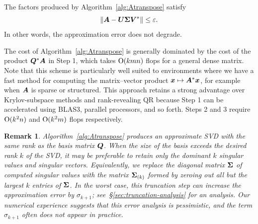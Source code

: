 \documentclass[final]{siamltex}
\newcounter{algorithm}[section]
\newtheorem{remark}{Remark}[section]
\begin{document}
The factors produced by Algorithm~\ref{alg:Atranspose}
satisfy
\begin{equation} \label{eq:noworse}
\norm{ \mtx{A} - \mtx{U\Sigma V}^\adj } \leq \eps.
\end{equation}
In other words, the approximation error does not degrade.

The cost of Algorithm~\ref{alg:Atranspose} is generally dominated
by the cost of the product $\bm{Q}^* \bm{A}$ in Step 1, which
takes $\mathrm{O}(kmn)$ flops for a general dense matrix.  Note that this
scheme is particularly well suited to environments where we have a
fast method for computing the matrix--vector product
$\bm{x} \mapsto \bm{A}^* \bm{x}$, for example when $\bm{A}$ is
sparse or structured.  This approach retains a strong advantage
over Krylov-subspace methods and rank-revealing QR because Step 1
can be accelerated using BLAS3, parallel processors, and so forth.
Steps 2 and 3 require $\mathrm{O}(k^2 n)$ and
$\mathrm{O}(k^2 m)$ flops respectively.



\lsp

\begin{remark} \label{rem:truncation} \rm
Algorithm~\ref{alg:Atranspose} produces an approximate SVD
with the same rank as the basis matrix $\bm{Q}$.  When the
size of the basis exceeds the desired rank $k$ of the SVD,
it may be preferable to %
retain only the dominant $k$ singular values and singular vectors.
Equivalently, we replace the diagonal matrix $\bm{\Sigma}$ of
computed singular values with the matrix $\bm{\Sigma}_{(k)}$
formed by zeroing out all but the largest $k$ entries of $\bm{\Sigma}$.
In the worst case, this truncation step can increase the approximation error
by $\sigma_{k+1}$; see~\S\ref{sec:truncation-analysis} for an analysis.
Our numerical experience suggests that this error analysis is pessimistic,
and the term $\sigma_{k+1}$ often does not appear in practice.
\end{remark}
\end{document}
